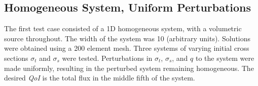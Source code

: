 \documentclass{article}
\newcommand{\sigt}{\sigma_t}
\newcommand{\sigs}{\sigma_s}
\newcommand{\scalSource}{q}
\newcommand{\qoi}{{\it QoI}\xspace}
\begin{document}
\subsection{Homogeneous System, Uniform Perturbations}
The first test case consisted of a 1D homogeneous system, with a volumetric source throughout. The width of the system was 10 (arbitrary units). Solutions were obtained using a 200 element mesh. Three systems of varying initial cross sections $\sigt$ and $\sigs$ were tested. Perturbations in $\sigt$, $\sigs$, and $\scalSource$ to the system were made uniformly, resulting in the perturbed system remaining homogeneous. The desired \qoi is the total flux in the middle fifth of the system.
\end{document}
